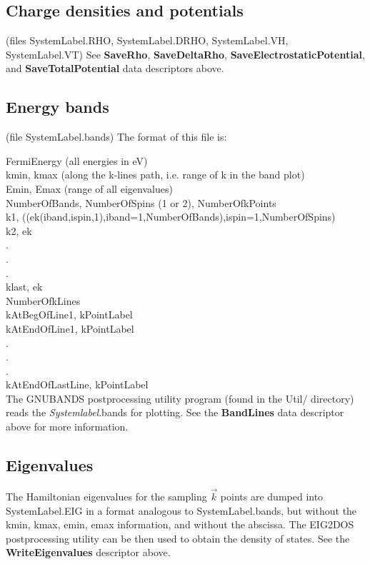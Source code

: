 \documentclass[11pt]{article}
\begin{document}
\subsection{Charge densities and potentials}
(files SystemLabel.RHO, SystemLabel.DRHO, SystemLabel.VH, SystemLabel.VT) 
See {\bf SaveRho}, {\bf SaveDeltaRho}, {\bf SaveElectrostaticPotential},
and {\bf SaveTotalPotential} data descriptors above.


\subsection{Energy bands}
(file SystemLabel.bands) The format of this file is:

\noindent
FermiEnergy (all energies in eV) \\
kmin, kmax (along the k-lines path, i.e. range of k in the band plot) \\
Emin, Emax (range of all eigenvalues) \\
NumberOfBands, NumberOfSpins (1 or 2), NumberOfkPoints \\
k1, ((ek(iband,ispin,1),iband=1,NumberOfBands),ispin=1,NumberOfSpins) \\
k2, ek \\
 . \\
 . \\
 . \\
klast, ek \\
NumberOfkLines \\
kAtBegOfLine1, kPointLabel \\
kAtEndOfLine1, kPointLabel \\
  . \\
  . \\
  . \\
kAtEndOfLastLine, kPointLabel \\

\noindent
The GNUBANDS postprocessing utility
program (found in the Util/ directory) reads the {\it Systemlabel}.bands
for plotting.
See the {\bf BandLines} data descriptor above for more information.

\subsection{Eigenvalues}
The Hamiltonian eigenvalues for the sampling $\vec k$ points are
dumped into SystemLabel.EIG in a format analogous to SystemLabel.bands,
but without the kmin, kmax, emin, emax information, and without
the abscissa. The EIG2DOS
postprocessing utility can be then used to obtain the density of
states. 
See the {\bf WriteEigenvalues} descriptor above.
\end{document}
